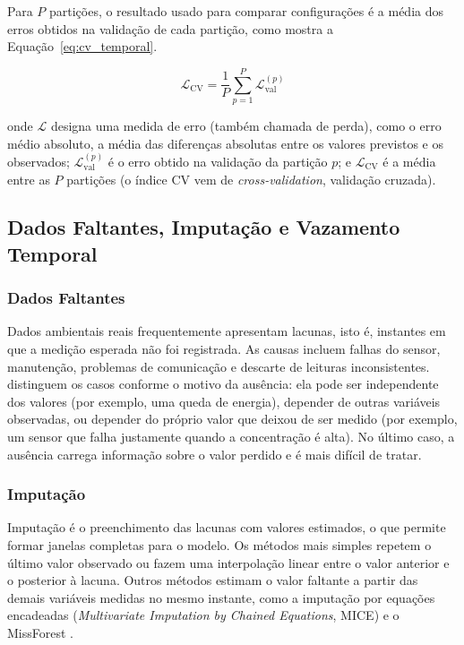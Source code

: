 Para \(P\) partições, o resultado usado para comparar configurações é a média dos erros obtidos na validação de cada partição, como mostra a Equação~\ref{eq:cv_temporal}.

\begin{equation}
    \mathcal{L}_{\mathrm{CV}}
    =
    \frac{1}{P}\sum_{p=1}^{P}
    \mathcal{L}_{\mathrm{val}}^{(p)}
    \label{eq:cv_temporal}
\end{equation}

\noindent onde \(\mathcal{L}\) designa uma medida de erro (também chamada de perda), como o erro médio absoluto, a média das diferenças absolutas entre os valores previstos e os observados; \(\mathcal{L}_{\mathrm{val}}^{(p)}\) é o erro obtido na validação da partição \(p\); e \(\mathcal{L}_{\mathrm{CV}}\) é a média entre as \(P\) partições (o índice CV vem de \textit{cross-validation}, validação cruzada).

\subsection{Dados Faltantes, Imputação e Vazamento Temporal}
\label{sec:dados_faltantes_imputacao}

\subsubsection{Dados Faltantes}

Dados ambientais reais frequentemente apresentam lacunas, isto é, instantes em que a medição esperada não foi registrada. As causas incluem falhas do sensor, manutenção, problemas de comunicação e descarte de leituras inconsistentes.  distinguem os casos conforme o motivo da ausência: ela pode ser independente dos valores (por exemplo, uma queda de energia), depender de outras variáveis observadas, ou depender do próprio valor que deixou de ser medido (por exemplo, um sensor que falha justamente quando a concentração é alta). No último caso, a ausência carrega informação sobre o valor perdido e é mais difícil de tratar.

\subsubsection{Imputação}

Imputação é o preenchimento das lacunas com valores estimados, o que permite formar janelas completas para o modelo. Os métodos mais simples repetem o último valor observado ou fazem uma interpolação linear entre o valor anterior e o posterior à lacuna. Outros métodos estimam o valor faltante a partir das demais variáveis medidas no mesmo instante, como a imputação por equações encadeadas (\textit{Multivariate Imputation by Chained Equations}, MICE) e o MissForest \cite{vanbuuren2011mice,stekhoven2012missforest}.

